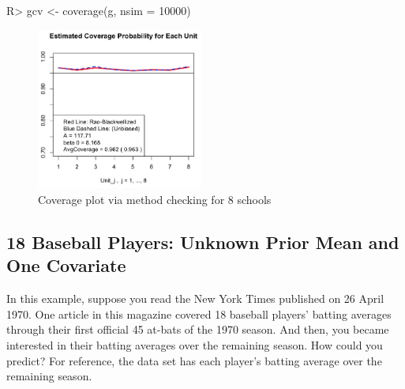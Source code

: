 \documentclass[article]{jss}
\begin{document}
\begin{CodeChunk}
\begin{CodeInput}
R> gcv <- coverage(g, nsim = 10000)
\end{CodeInput}
\end{CodeChunk}
\begin{figure}[h]
\begin{center}
\includegraphics[width = 5.5cm]{school2.png}
\caption{Coverage plot via method checking for 8 schools}
\end{center}
\end{figure}



\subsection[Unknown Second-level Mean and One Covariate]{18 Baseball Players: Unknown Prior Mean and One Covariate}
In this example, suppose you read the New York Times published on 26 April 1970. One article in this magazine covered 18 baseball players' batting averages through their first official 45 at-bats of the 1970 season. And then, you became interested in their batting averages over the remaining season. How could you predict? For reference, the data set   has each player's batting average over the remaining season. 
\end{document}
